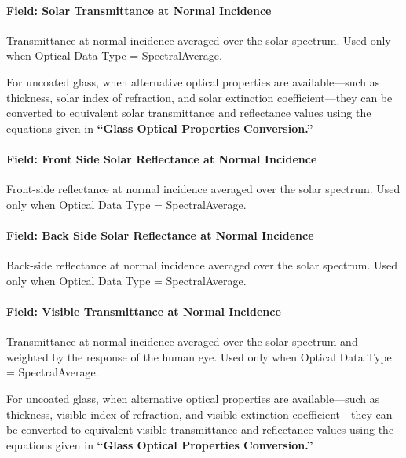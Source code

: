 \paragraph{Field: Solar Transmittance at Normal Incidence}\label{field-solar-transmittance-at-normal-incidence}

Transmittance at normal incidence averaged over the solar spectrum. Used only when Optical Data Type = SpectralAverage.

For uncoated glass, when alternative optical properties are available---such as thickness, solar index of refraction, and solar extinction coefficient---they can be converted to equivalent solar transmittance and reflectance values using the equations given in \textbf{``Glass Optical Properties Conversion.''}

\paragraph{Field: Front Side Solar Reflectance at Normal Incidence}\label{field-front-side-solar-reflectance-at-normal-incidence}

Front-side reflectance at normal incidence averaged over the solar spectrum. Used only when Optical Data Type = SpectralAverage.

\paragraph{Field: Back Side Solar Reflectance at Normal Incidence}\label{field-back-side-solar-reflectance-at-normal-incidence}

Back-side reflectance at normal incidence averaged over the solar spectrum. Used only when Optical Data Type = SpectralAverage.

\paragraph{Field: Visible Transmittance at Normal Incidence}\label{field-visible-transmittance-at-normal-incidence}

Transmittance at normal incidence averaged over the solar spectrum and weighted by the response of the human eye. Used only when Optical Data Type = SpectralAverage.

For uncoated glass, when alternative optical properties are available---such as thickness, visible index of refraction, and visible extinction coefficient---they can be converted to equivalent visible transmittance and reflectance values using the equations given in \textbf{``Glass Optical Properties Conversion.''}

